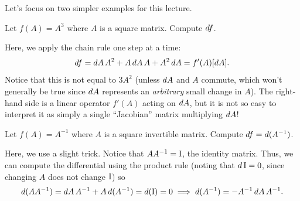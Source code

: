 Let's focus on two simpler examples for this lecture.
\begin{example}
    Let $f(A) = A^3$ where $A$ is a square matrix. Compute $d f$.
\end{example}

Here, we apply the chain rule one step at a time:
\[
d f = d A\, A^2 + A \,d A \, A + A^2 \,d A = f'(A) [d A].
\]
Notice that this is not equal to $3A^2$ (unless $d A$ and $A$ commute, which won't generally be true since $d A$ represents an \emph{arbitrary} small change in $A$).   The right-hand side is a linear operator $f'(A)$ acting on $d A$, but it is not so easy to interpret it as simply a single ``Jacobian'' matrix multiplying $d A$!

\begin{example}
    Let $f(A) = A^{-1}$ where $A$ is a square invertible matrix. Compute $d f = d(A^{-1})$.
\end{example}

Here, we use a slight trick. Notice that $AA^{-1} = \operatorname{I}$, the identity matrix. Thus, we can compute the differential using the product rule (noting that $d\operatorname{I} = 0$, since changing $A$ does not change $\operatorname{I}$) so
\[
d(AA^{-1}) = d A\, A^{-1} + A\,d(A^{-1}) = d (\operatorname{I}) = 0\implies d(A^{-1}) = -A^{-1} \,d A \,A^{-1}.
\]
